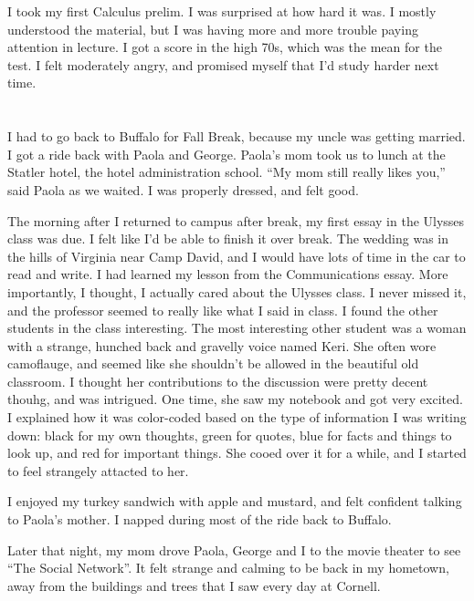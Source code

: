 I took my first Calculus prelim.  I was surprised at how hard it was.  I mostly
understood the material, but I was having more and more trouble paying attention
in lecture.  I got a score in the high 70s, which was the mean for the test.  I
felt moderately angry, and promised myself that I'd study harder next time.

\section{}

I had to go back to Buffalo for Fall Break, because my uncle was getting
married.  I got a ride back with Paola and George.  Paola's mom took us to lunch
at the Statler hotel, the hotel administration school.  ``My mom still really
likes you,'' said Paola as we waited.   I was properly dressed, and felt good.  

The morning after I returned to campus after break, my first essay in the
Ulysses class was due.  I felt like I'd be able to finish it over break.  The
wedding was in the hills of Virginia near Camp David, and I would have lots of
time in the car to read and write.  I had learned my lesson from the
Communications essay.  More importantly, I thought, I actually cared about the
Ulysses class.  I never missed it, and the professor seemed to really like what
I said in class.  I found the other students in the class interesting.  The most
interesting other student was a woman with a strange, hunched back and gravelly
voice named Keri.  She often wore camoflauge, and seemed like she shouldn't be
allowed in the beautiful old classroom.  I thought her contributions to the
discussion were pretty decent thouhg, and was intrigued.  One time, she saw my
notebook and got very excited.  I explained how it was color-coded based on the
type of information I was writing down: black for my own thoughts, green for
quotes, blue for facts and things to look up, and red for important things.  She
cooed over it for a while, and I started to feel strangely attacted to her.

I enjoyed my turkey sandwich with apple and mustard, and felt confident talking
to Paola's mother.  I napped during most of the ride back to Buffalo.  

Later that night, my mom drove Paola, George and I to the movie theater to see
``The Social Network''.  It felt strange and calming to be back in my hometown,
away from the buildings and trees that I saw every day at Cornell.  

